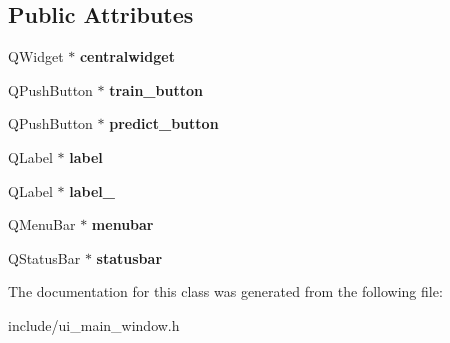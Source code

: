 \subsection*{Public Attributes}
\begin{DoxyCompactItemize}
\item 
\mbox{\label{class_ui___main___window_af0e764b378b7235798e1cd2fe932787d}} 
Q\+Widget $\ast$ {\bfseries centralwidget}
\item 
\mbox{\label{class_ui___main___window_a8dbba45531ac8fe36d04f940ee5fe044}} 
Q\+Push\+Button $\ast$ {\bfseries train\+\_\+button}
\item 
\mbox{\label{class_ui___main___window_a602782daba8896fb6269d4c4873cbf90}} 
Q\+Push\+Button $\ast$ {\bfseries predict\+\_\+button}
\item 
\mbox{\label{class_ui___main___window_afe543d55066d0c25634feb61e4d095bc}} 
Q\+Label $\ast$ {\bfseries label}
\item 
\mbox{\label{class_ui___main___window_aaf37d6dfb011d3add4881e8ed68b6133}} 
Q\+Label $\ast$ {\bfseries label\+\_}
\item 
\mbox{\label{class_ui___main___window_ab34e1f3fe23fccef905a5de9bf55d5e4}} 
Q\+Menu\+Bar $\ast$ {\bfseries menubar}
\item 
\mbox{\label{class_ui___main___window_a87d92af0212873732901b0adb0659740}} 
Q\+Status\+Bar $\ast$ {\bfseries statusbar}
\end{DoxyCompactItemize}


The documentation for this class was generated from the following file\+:\begin{DoxyCompactItemize}
\item 
include/ui\+\_\+main\+\_\+window.\+h\end{DoxyCompactItemize}
